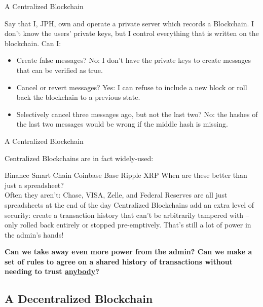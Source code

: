 \documentclass[aspectratio=169]{beamer}
\begin{document}
\begin{frame}{A Centralized Blockchain}

Say that I, JPH, own and operate a private server which records a Blockchain. I don't know the users' private keys, but I control everything that is written on the blockchain. Can I: \pause 
\begin{itemize}
    \item Create false messages? \pause 
    \bi 
    \m No: I don't have the private keys to create messages that can be verified as true. \pause 
    \ei 
    \item Cancel or revert messages? \pause
    \bi 
    \m Yes: I can refuse to include a new block or roll back the blockchain to a previous state. \pause 
    \ei 
    \item Selectively cancel three messages ago, but not the last two? \pause 
    \bi 
    \m No: the hashes of the last two messages would be wrong if the middle hash is missing. 
    \ei 
\end{itemize}
    
\end{frame}

\begin{frame}{A Centralized Blockchain}

Centralized Blockchains are in fact widely-used: 

\bi 
\m Binance Smart Chain 
\m Coinbase Base 
\m Ripple XRP 
\ei \pause 
When are these better than just a spreadsheet? \pause \\ 
\bi 
\m Often they aren't: Chase, VISA, Zelle, and Federal Reserves are all just spreadsheets at the end of the day \pause 
\m Centralized Blockchains add an extra level of security: create a transaction history that can't be arbitrarily tampered with -- only rolled back entirely or stopped pre-emptively. \pause  
\m That's still a lot of power in the admin's hands! \pause 
\ei 

\textbf{Can we take away even more power from the admin? Can we make a set of rules to agree on a shared history of transactions without needing to trust \ul{anybody}?}

\end{frame}


\subsection{A Decentralized Blockchain}
\end{document}
